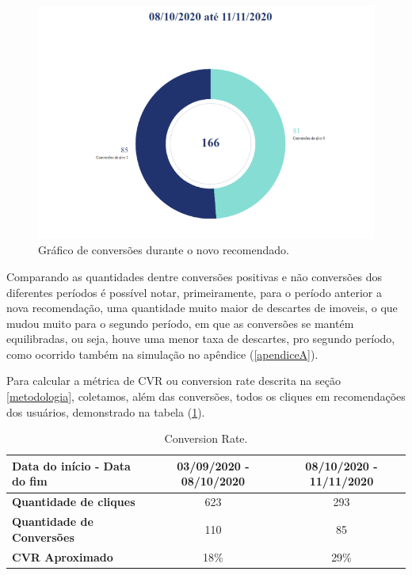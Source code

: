 \begin{figure}[H]
    \centering
    \includegraphics[scale=0.6]{figuras/desenvolvimento/grafico2.png}
    \caption[Gráfico de conversões durante o novo recomendador]{Gráfico de conversões durante o novo recomendado.}
    \label{fig:grafico2}
\end{figure}

Comparando as quantidades dentre conversões positivas e não conversões dos diferentes períodos é possível notar, primeiramente, para o período anterior a nova recomendação, uma quantidade muito maior de descartes de imoveis, o que mudou muito para o segundo período, em que as conversões se mantém equilibradas, ou seja, houve uma menor taxa de descartes, pro segundo período, como ocorrido também na simulação no apêndice (\ref{apendiceA}).

Para calcular a métrica de CVR ou conversion rate descrita na seção \ref{metodologia}, coletamos, além das conversões, todos os cliques em recomendações dos usuários, demonstrado na tabela (\ref{tab:my-table3}).

\begin{table}[H]
\centering
\caption[Conversion Rate]{Conversion Rate.}
\begin{tabular}{lcc}
\hline
\textbf{Data do início - Data do fim} & 03/09/2020 - 08/10/2020 & 08/10/2020 - 11/11/2020 \\ \hline
\textbf{Quantidade de cliques} & 623 & 293 \\ \hline
\textbf{Quantidade de Conversões} & 110 & 85 \\ \hline
\textbf{CVR Aproximado} & 18\% & 29\% \\ \hline
\end{tabular}
\label{tab:my-table3}
\end{table}

